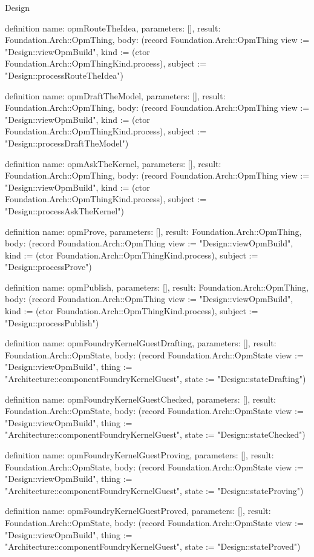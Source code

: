 \begin{lexlean}{Design}
\begin{semanticmodule}
definition{
  name: opmRouteTheIdea,
  parameters: [],
  result: Foundation.Arch::OpmThing,
  body: (record Foundation.Arch::OpmThing {view := "Design::viewOpmBuild", kind := (ctor Foundation.Arch::OpmThingKind.process), subject := "Design::processRouteTheIdea"})
}

definition{
  name: opmDraftTheModel,
  parameters: [],
  result: Foundation.Arch::OpmThing,
  body: (record Foundation.Arch::OpmThing {view := "Design::viewOpmBuild", kind := (ctor Foundation.Arch::OpmThingKind.process), subject := "Design::processDraftTheModel"})
}

definition{
  name: opmAskTheKernel,
  parameters: [],
  result: Foundation.Arch::OpmThing,
  body: (record Foundation.Arch::OpmThing {view := "Design::viewOpmBuild", kind := (ctor Foundation.Arch::OpmThingKind.process), subject := "Design::processAskTheKernel"})
}

definition{
  name: opmProve,
  parameters: [],
  result: Foundation.Arch::OpmThing,
  body: (record Foundation.Arch::OpmThing {view := "Design::viewOpmBuild", kind := (ctor Foundation.Arch::OpmThingKind.process), subject := "Design::processProve"})
}

definition{
  name: opmPublish,
  parameters: [],
  result: Foundation.Arch::OpmThing,
  body: (record Foundation.Arch::OpmThing {view := "Design::viewOpmBuild", kind := (ctor Foundation.Arch::OpmThingKind.process), subject := "Design::processPublish"})
}

definition{
  name: opmFoundryKernelGuestDrafting,
  parameters: [],
  result: Foundation.Arch::OpmState,
  body: (record Foundation.Arch::OpmState {view := "Design::viewOpmBuild", thing := "Architecture::componentFoundryKernelGuest", state := "Design::stateDrafting"})
}

definition{
  name: opmFoundryKernelGuestChecked,
  parameters: [],
  result: Foundation.Arch::OpmState,
  body: (record Foundation.Arch::OpmState {view := "Design::viewOpmBuild", thing := "Architecture::componentFoundryKernelGuest", state := "Design::stateChecked"})
}

definition{
  name: opmFoundryKernelGuestProving,
  parameters: [],
  result: Foundation.Arch::OpmState,
  body: (record Foundation.Arch::OpmState {view := "Design::viewOpmBuild", thing := "Architecture::componentFoundryKernelGuest", state := "Design::stateProving"})
}

definition{
  name: opmFoundryKernelGuestProved,
  parameters: [],
  result: Foundation.Arch::OpmState,
  body: (record Foundation.Arch::OpmState {view := "Design::viewOpmBuild", thing := "Architecture::componentFoundryKernelGuest", state := "Design::stateProved"})
}


\end{semanticmodule}
\end{lexlean}
